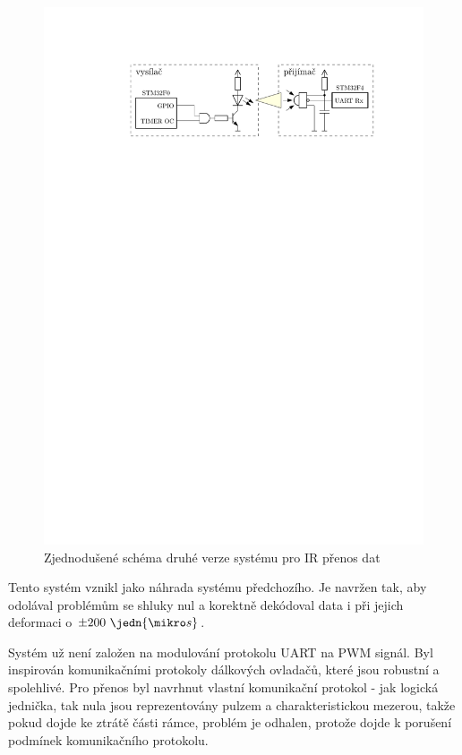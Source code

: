 \begin{figure}[H]
    \begin{center}
        \includegraphics[width=\textwidth]{img/ir-system}
    \end{center}
    \caption{Zjednodušené schéma druhé verze systému pro IR přenos dat}
\end{figure}

Tento systém vznikl jako náhrada systému předchozího. Je navržen tak, aby odolával problémům se shluky nul a korektně dekódoval data i při jejich deformaci o $\pm200~\jedn{\mikro s}$.

Systém už není založen na modulování protokolu UART na PWM signál. Byl inspirován komunikačními protokoly dálkových ovladačů, které jsou robustní a spolehlivé. Pro přenos byl navrhnut vlastní komunikační protokol - jak logická jednička, tak nula jsou reprezentovány pulzem a charakteristickou mezerou, takže pokud dojde ke ztrátě části rámce, problém je odhalen, protože dojde k porušení podmínek komunikačního protokolu.

